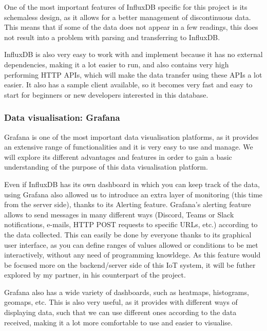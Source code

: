 \documentclass[12pt]{article}
\begin{document}
One of the most important features of InfluxDB specific for this project is its schemaless design, as it allows for a better management of discontinuous data. This means that if some of the data does not appear in a few readings, this does not result into a problem with parsing and transferring to InfluxDB.\par 

InfluxDB is also very easy to work with and implement because it has no external dependencies, making it a lot easier to run, and also contains very high performing HTTP APIs, which will make the data transfer using these APIs a lot easier. It also has a sample client available, so it becomes very fast and easy to start for beginners or new developers interested in this database.

\subsubsection{Data visualisation: Grafana}

Grafana is one of the most important data visualisation platforms, as it provides an extensive range of functionalities and it is very easy to use and manage. We will explore its different advantages and features in order to gain a basic understanding of the purpose of this data visualisation platform.\par

Even if InfluxDB has its own dashboard in which you can keep track of the data, using Grafana also allowed us to introduce an extra layer of monitoring (this time from the server side), thanks to its Alerting feature. Grafana's alerting feature allows to send messages in many different ways (Discord, Teams or Slack notifications, e-mails, HTTP POST requests to specific URLs, etc.) according to the data collected. This can easily be done by everyone thanks to its graphical user interface, as you can define ranges of values allowed or conditions to be met interactively, without any need of programming knowldege. As this feature would be focused more on the backend/server side of this IoT system, it will be futher explored by my partner, in his counterpart of the project.

Grafana also has a wide variety of dashboards, such as heatmaps, histograms, geomaps, etc. This is also very useful, as it provides with different ways of displaying data, such that we can use different ones according to the data received, making it a lot more comfortable to use and easier to visualise.\par
\end{document}

